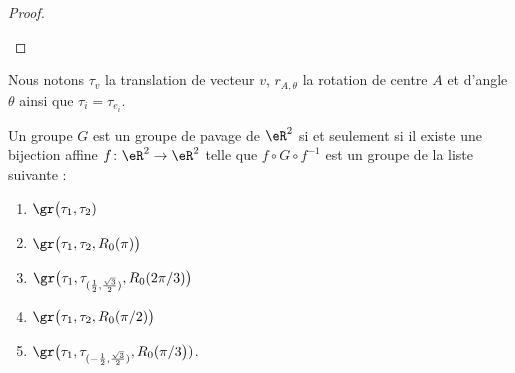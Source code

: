 \begin{proof}
\begin{subproof}
    \end{subproof}
\end{proof}


\begin{theorem}       \label{THOooUPHQooYfeHAy}
    Nous notons \( \tau_v\) la translation de vecteur \( v\), \( r_{A,\theta}\) la rotation de centre \( A\) et d'angle \( \theta\) ainsi que \( \tau_i=\tau_{e_i}\).

    Un groupe \( G\) est un groupe de pavage de \( \eR^2\) si et seulement si il existe une bijection affine \( f\colon \eR^2\to \eR^2\) telle que \( f\circ G\circ f^{-1}\) est un groupe de la liste suivante :
    \begin{enumerate}
        \item
            \( \gr\big(\tau_1,\tau_2)\)
        \item
            \( \gr\big(\tau_1,\tau_2,R_0(\pi)\big)\)
        \item
            \( \gr\big(\tau_1,\tau_{(\frac{ 1 }{2},\frac{ \sqrt{ 3 } }{ 2 })},R_0(2\pi/3)\big)\)
        \item
            \( \gr\big(\tau_1,\tau_2,R_0(\pi/2)\big)\)
        \item
            \( \gr\big(\tau_1,\tau_{(-\frac{ 1 }{2},\frac{ \sqrt{ 3 } }{2})},R_0(\pi/3\big))\).
    \end{enumerate}
\end{theorem}

